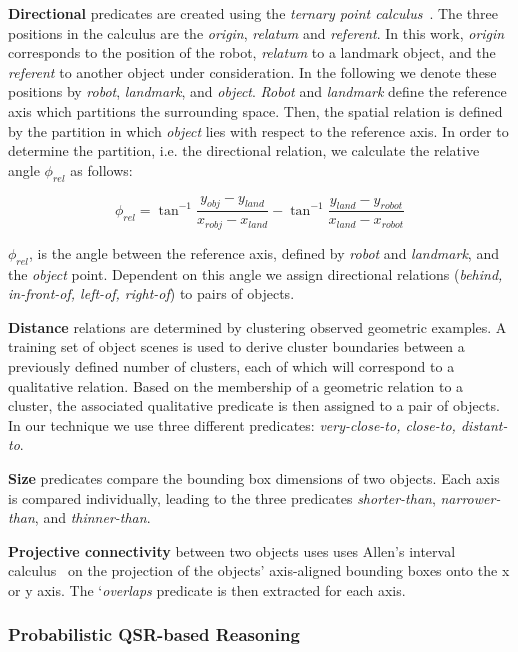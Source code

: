 \documentclass[letterpaper]{article}
\begin{document}
\textbf{Directional} predicates are created using the \emph{ternary point calculus}~\cite{Moratz:2003ti}. The three positions in the calculus are the \emph{origin}, \emph{relatum} and \emph{referent}. In this work, \emph{origin} corresponds to the position of the robot, \emph{relatum} to a landmark object, and the \emph{referent} to another object under consideration. In the following we denote these positions by \emph{robot}, \emph{landmark}, and \emph{object}. \emph{Robot} and \emph{landmark} define the reference axis which partitions the surrounding space. Then, the spatial relation is defined by the partition in which \emph{object} lies with respect to the reference axis. In order to determine the partition, i.e. the directional relation, we calculate the relative angle $\phi_{rel}$ as follows:

\begin{equation}
  \phi_{rel} = \tan^{-1} \frac{y_{obj} - y_{land}}{x_{robj} - x_{land}} - \tan^{-1} \frac{y_{land} - y_{robot}}{x_{land} - x_{robot}}
\end{equation}

\noindent $\phi_{rel}$, is the angle between the reference axis, defined by \emph{robot} and \emph{landmark}, and the \emph{object} point. Dependent on this angle we assign directional relations (\emph{behind, in-front-of, left-of, right-of}) to pairs of objects.

\textbf{Distance} relations are determined by clustering observed geometric examples. A training set of object scenes is used to derive cluster boundaries between a previously defined number of clusters, each of which will correspond to a  qualitative relation. Based on the membership of a geometric relation to a cluster, the associated qualitative predicate is then assigned to a pair of objects. In our technique we use three different predicates: \emph{very-close-to, close-to, distant-to}.

\textbf{Size} predicates compare the bounding box dimensions of two objects. Each axis is compared individually, leading to the three predicates \emph{shorter-than}, \emph{narrower-than}, and \emph{thinner-than}.

\textbf{Projective connectivity} between two objects uses uses Allen's interval calculus~\cite{Allen83} on the projection of the objects' axis-aligned bounding boxes onto the x or y axis. The `\emph{overlaps} predicate is then extracted for each axis. 



\subsubsection{Probabilistic QSR-based Reasoning}
\end{document}
